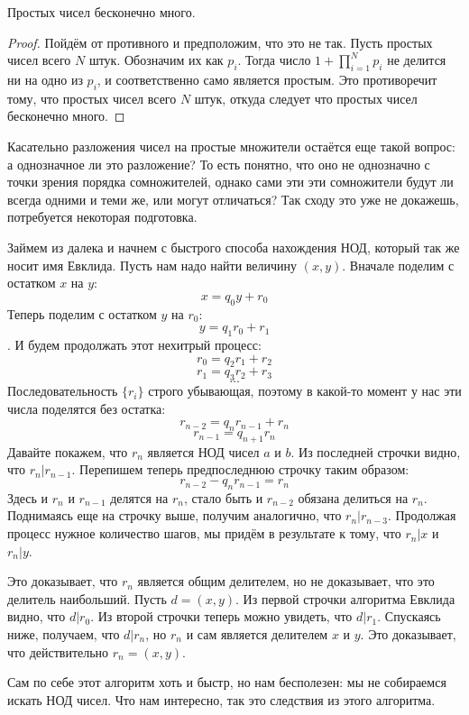 \begin{Euclids}
Простых чисел бесконечно много.
\end{Euclids}
\begin{proof}
Пойдём от противного и предположим, что это не так. Пусть простых чисел всего $N$ штук. Обозначим их как ${p_i}$. Тогда число $1 + \prod_{i=1}^N p_i$ не делится ни на одно из $p_i$, и соответственно само является простым. Это противоречит тому, что простых чисел всего $N$ штук, откуда следует что простых чисел бесконечно много.
\end{proof}

Касательно разложения чисел на простые множители остаётся еще такой вопрос: а однозначное ли это разложение? То есть понятно, что оно не однозначно с точки зрения порядка сомножителей, однако сами эти эти сомножители будут ли всегда одними и теми же, или могут отличаться? Так сходу это уже не докажешь, потребуется некоторая подготовка.

Займем из далека и начнем с быстрого способа нахождения НОД, который так же носит имя Евклида. Пусть нам надо найти величину $(x, y)$. Вначале поделим с остатком $x$ на $y$:
$$x = q_0 y + r_0$$
Теперь поделим с остатком $y$ на $r_0$:
$$y = q_1 r_0 + r_1$$.
И будем продолжать этот нехитрый процесс:
$$r_0 = q_2 r_1 + r_2$$
$$r_1 = q_3 r_2 + r_3$$
$$\dots$$
Последовательность $\{r_i\}$ строго убывающая, поэтому в какой-то момент у нас эти числа поделятся без остатка:
$$r_{n-2} = q_n r_{n-1} + r_n$$
$$r_{n-1} = q_{n+1} r_n$$
Давайте покажем, что $r_n$ является НОД чисел $a$ и $b$. Из последней строчки видно, что $r_n | r_{n-1}$. Перепишем теперь предпоследнюю строчку таким образом:
$$r_{n - 2} - q_n r_{n - 1} = r_n$$
Здесь и $r_n$ и $r_{n-1}$ делятся на $r_n$, стало быть и $r_{n-2}$ обязана делиться на $r_n$. Поднимаясь еще на строчку выше, получим аналогично, что $r_n|r_{n-3}$. Продолжая процесс нужное количество шагов, мы придём в результате к тому, что $r_n|x$ и $r_n|y$.

Это доказывает, что $r_n$ является общим делителем, но не доказывает, что это делитель наибольший. Пусть $d = (x, y)$. Из первой строчки алгоритма Евклида видно, что $d|r_0$. Из второй строчки теперь можно увидеть, что $d|r_1$. Спускаясь ниже, получаем, что $d|r_n$, но $r_n$ и сам является делителем $x$ и $y$. Это доказывает, что действительно $r_n = (x, y)$.

Сам по себе этот алгоритм хоть и быстр, но нам бесполезен: мы не собираемся искать НОД чисел. Что нам интересно, так это следствия из этого алгоритма.

